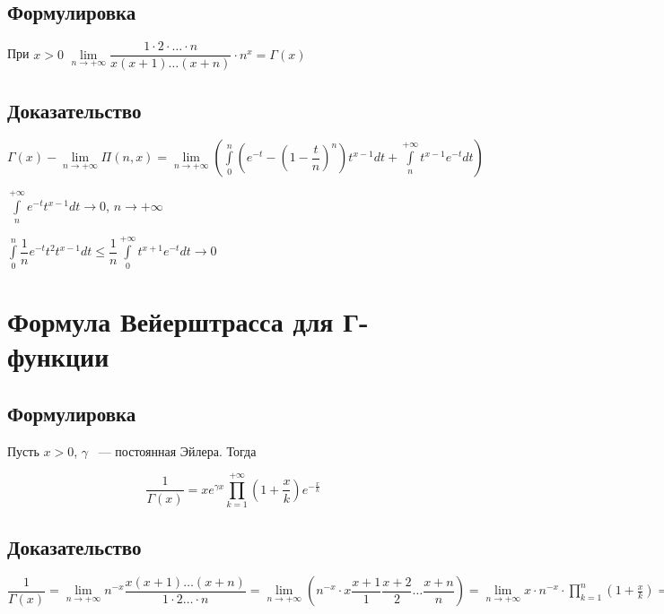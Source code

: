 \documentclass{article}
\begin{document}
        \subsection{Формулировка}
        
            При $x > 0$ $\lim\limits_{n \rightarrow +\infty} \dfrac{1 \cdot 2 \cdot \ldots \cdot n}{x(x+1)\ldots(x+n)} \cdot n^x = \Gamma(x)$
            
        \subsection{Доказательство}
        
            $\Gamma(x) - \lim\limits_{n \rightarrow +\infty} \Pi(n, x) = \lim\limits_{n \rightarrow +\infty} \left( \int\limits^n_0 \left(e^{-t} - \left(1 - \dfrac{t}{n} \right)^n \right) t^{x - 1} dt + \int\limits^{+\infty}_n t^{x - 1} e^{-t} dt \right)$
            
            $\int\limits^{+\infty}_n e^{-t} t^{x - 1} dt \rightarrow 0$, $n \rightarrow +\infty$
            
            $\int\limits^n_0 \dfrac{1}{n} e^{-t} t^2 t^{x - 1} dt \leq \dfrac{1}{n} \int\limits^{+\infty}_0 t^{x + 1}e^{-t}dt \rightarrow 0$
            
    \newpage
    
    \section{Формула Вейерштрасса для Г-функции}
    
        \subsection{Формулировка}
        
            Пусть $x > 0$, $\gamma$ ~--- постоянная Эйлера. Тогда
            
            $$\dfrac{1}{\Gamma(x)} = x e^{\gamma x} \prod\limits^{+\infty}_{k = 1} \left( 1 + \dfrac{x}{k} \right) e^{-\frac{x}{k}}$$
            
        \subsection{Доказательство}
        
            $\dfrac{1}{\Gamma(x)} = \lim\limits_{n \rightarrow +\infty} n^{-x} \dfrac{x(x+1)\ldots(x+n)}{1 \cdot 2 \ldots \cdot n} = \lim\limits_{n \rightarrow +\infty} \left( n^{-x} \cdot x \dfrac{x + 1}{1} \dfrac{x + 2}{2} \ldots \dfrac{x + n}{n} \right) = \lim\limits_{n \rightarrow +\infty} x \cdot n^{-x} \cdot \prod^n_{k = 1} \left( 1 + \frac{x}{k} \right) = \lim\limits_{n \rightarrow +\infty} x e^{x \left(1 + \frac{1}{2} + \ldots + \frac{1}{n} \right)} \cdot e^{-x \ln n} \prod^n_{k = 1} \left( 1 + \dfrac{x}{k} \right) e^{-\frac{x}{k}} = x \cdot e^{\gamma} \prod^{+\infty}_{k = 1} \left( 1 + \dfrac{x}{k} \right) e^{-\frac{x}{k}}$
            
\end{document}
